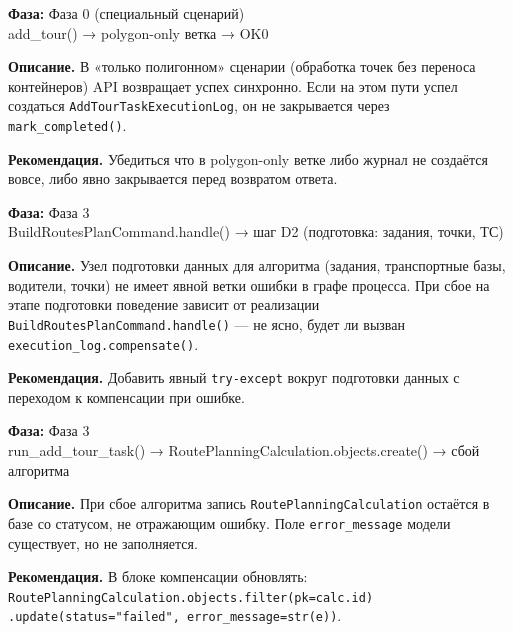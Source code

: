 \documentclass[11pt, a4paper, oneside]{article}
\newcommand{\coderef}[1]{{\footnotesize\color{MidGray}\ttfamily #1}}
\begin{document}
\begin{warnbox}[title={⚠️ \#6 — Polygon-only сценарий не закрывает журнал выполнения}]

\textbf{Фаза:} Фаза 0 (специальный сценарий)\\
\coderef{add\_tour() → polygon-only ветка → OK0}

\textbf{Описание.}
В «только полигонном» сценарии (обработка точек без переноса контейнеров)
API возвращает успех синхронно.
Если на этом пути успел создаться \texttt{AddTourTaskExecutionLog},
он не закрывается через \texttt{mark\_completed()}.

\textbf{Рекомендация.}
Убедиться что в polygon-only ветке либо журнал не создаётся вовсе,
либо явно закрывается перед возвратом ответа.
\end{warnbox}

\begin{warnbox}[title={⚠️ \#7 — Отсутствует обработка ошибок при подготовке данных для алгоритма}]

\textbf{Фаза:} Фаза 3\\
\coderef{BuildRoutesPlanCommand.handle() → шаг D2 (подготовка: задания, точки, ТС)}

\textbf{Описание.}
Узел подготовки данных для алгоритма (задания, транспортные базы,
водители, точки) не имеет явной ветки ошибки в графе процесса.
При сбое на этапе подготовки поведение зависит от реализации
\texttt{BuildRoutesPlanCommand.handle()} — не ясно, будет ли вызван
\texttt{execution\_log.compensate()}.

\textbf{Рекомендация.}
Добавить явный \texttt{try-except} вокруг подготовки данных
с переходом к компенсации при ошибке.
\end{warnbox}

\begin{warnbox}[title={⚠️ \#8 — RoutePlanningCalculation остаётся без статуса ошибки}]

\textbf{Фаза:} Фаза 3\\
\coderef{run\_add\_tour\_task() → RoutePlanningCalculation.objects.create() → сбой алгоритма}

\textbf{Описание.}
При сбое алгоритма запись \texttt{RoutePlanningCalculation}
остаётся в базе со статусом, не отражающим ошибку.
Поле \texttt{error\_message} модели существует, но не заполняется.

\textbf{Рекомендация.}
В блоке компенсации обновлять:
\texttt{RoutePlanningCalculation.objects.filter(pk=calc.id)\\
.update(status="failed", error\_message=str(e))}.
\end{warnbox}
\end{document}
